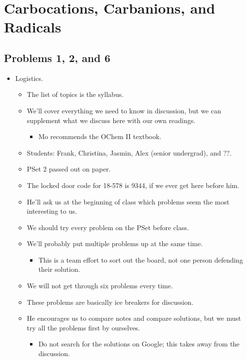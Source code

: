 \documentclass[../notes.tex]{subfiles}
\begin{document}
\chapter{Carbocations, Carbanions, and Radicals}
\section{Problems 1, 2, and 6}
\begin{itemize}
    \item {}Logistics.
    \begin{itemize}
        \item The list of topics is the syllabus.
        \item We'll cover everything we need to know in discussion, but we can supplement what we discuss here with our own readings.
        \begin{itemize}
            \item Mo recommends the OChem II textbook.
        \end{itemize}
        \item Students: Frank, Christina, Jasmin, Alex (senior undergrad), and ??.
        \item PSet 2 passed out on paper.
        \item The locked door code for 18-578 is 9344, if we ever get here before him.
        \item He'll ask us at the beginning of class which problems seem the most interesting to us.
        \item We should try every problem on the PSet before class.
        \item We'll probably put multiple problems up at the same time.
        \begin{itemize}
            \item This is a team effort to sort out the board, not one person defending their solution.
        \end{itemize}
        \item We will not get through six problems every time.
        \item These problems are basically ice breakers for discussion.
        \item He encourages us to compare notes and compare solutions, but we must try all the problems first by ourselves.
        \begin{itemize}
            \item Do not search for the solutions on Google; this takes away from the discussion.

\end{itemize}
\end{itemize}
\end{itemize}
\end{document}
